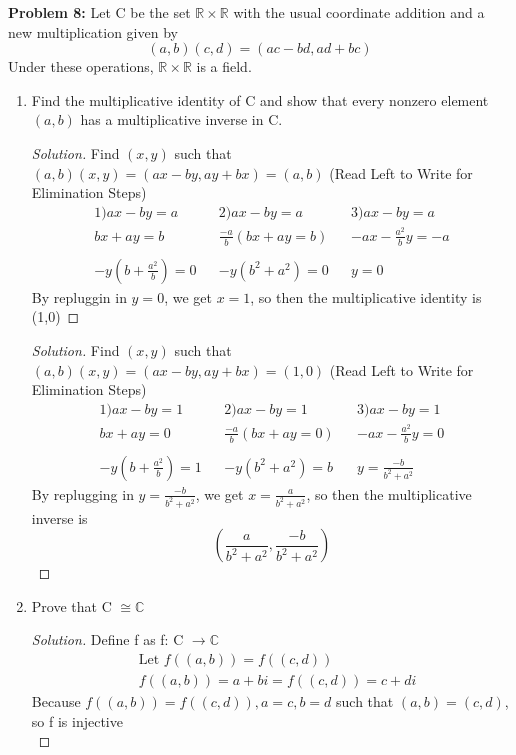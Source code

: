 \documentclass[12pt]{article}
\begin{document}
\newpage 
\noindent \textbf{Problem 8: } Let C be the set $\mathbb{R} \times \mathbb{R}$ with the usual coordinate addition and a new multiplication given by 
$$ (a,b)(c,d) = (ac - bd, ad + bc) $$
Under these operations, $\mathbb{R} \times \mathbb{R}$ is a field.
	\begin{enumerate}[label = (\alph*)]
		\item Find the multiplicative identity of C and show that every nonzero element $(a,b)$ has a multiplicative inverse in C.
		\begin{proof}[Solution]
			Find $(x,y)$ such that $(a,b)(x,y) = (ax - by, ay + bx) = (a,b)$ (Read Left to Write for Elimination Steps)
			\begin{align*}
				1) ax - by = a   && 2) ax - by = a && 3) ax - by = a\\ 
				bx + ay = b   && \frac{-a}{b}(bx + ay = b) && -ax - \frac{a^2}{b}y = -a \\ \\
				-y(b + \frac{a^2}{b}) = 0 && -y(b^2 + a^2) = 0 && y = 0
			\end{align*}
			By repluggin in $y = 0$, we get $x = 1$, so then the multiplicative identity is (1,0)
		\end{proof}
		\begin{proof}[Solution]
			Find $(x,y)$ such that $(a,b)(x,y) = (ax - by, ay + bx) = (1,0)$ (Read Left to Write for Elimination Steps)
			\begin{align*}
				1) ax - by = 1   && 2) ax - by = 1 && 3) ax - by = 1\\ 
				bx + ay = 0   && \frac{-a}{b}(bx + ay = 0) && -ax - \frac{a^2}{b}y = 0 \\ \\
				-y(b + \frac{a^2}{b}) = 1 && -y(b^2 + a^2) = b && y = \frac{-b}{b^2 + a^2}
			\end{align*}
			By replugging in $y = \frac{-b}{b^2 + a^2}$, we get $x = \frac{a}{b^2 + a^2}$, so then the multiplicative inverse is $$ \left(\frac{a}{b^2 + a^2}, \frac{-b}{b^2 + a^2}\right) $$
		\end{proof}
		\newpage
		\item Prove that C $\cong \mathbb{C}$
		\begin{proof}[Solution]
			Define f as f: C $\rightarrow \mathbb{C}$ 
			\begin{align}
				&\text{Let } f((a,b)) = f((c,d)) \\
				&f((a,b)) = a + bi = f((c,d)) = c + di
			\end{align}
			Because $f((a,b)) = f((c,d)), a = c, b =d $ such that $(a,b) = (c,d)$, so f is injective \\

\end{proof}
\end{enumerate}
\end{document}
